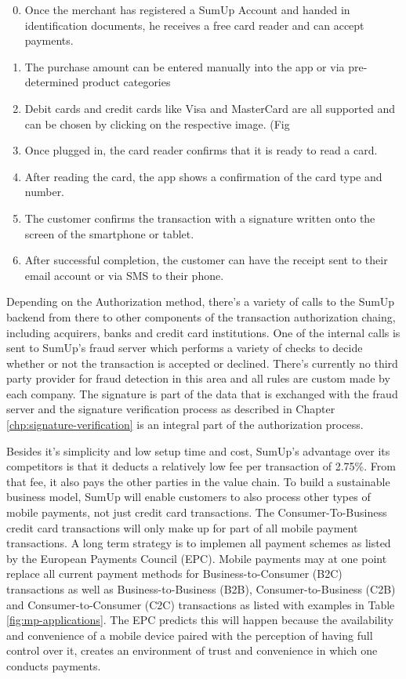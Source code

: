 \documentclass[a4paper, oneside]{csthesis}
\begin{document}
\begin{enumerate}
\setcounter{enumi}{-1}
    \item Once the merchant has registered a SumUp Account and handed in identification documents, he receives a free card reader and can accept payments.
    \item The purchase amount can be entered manually into the app or via pre-determined product categories %
    \item Debit cards and credit cards like Visa and MasterCard are all supported and can be chosen by clicking on the respective image. (Fig %
    \item Once plugged in, the card reader confirms that it is ready to read a card. %
    \item After reading the card, the app shows a confirmation of the card type and number. %
    \item The customer confirms the transaction with a signature written onto the screen of the smartphone or tablet. %
    \item After successful completion, the customer can have the receipt sent to their email account or via SMS to their phone. %
\end{enumerate}


Depending on the Authorization method, there's a variety of calls to the SumUp backend from there to other components of the transaction authorization chaing, including acquirers, banks and credit card institutions. One of the internal calls is sent to SumUp's fraud server which performs a variety of checks to decide whether or not the transaction is accepted or declined. There's currently no third party provider for fraud detection in this area and all rules are custom made by each company. The signature is part of the data that is exchanged with the fraud server and the signature verification process as described in Chapter \ref{chp:signature-verification} is an integral part of the  authorization process.

Besides it's simplicity and low setup time and cost, SumUp's advantage over its competitors is that it deducts a relatively low fee per transaction of 2.75\%. From that fee, it also pays the other parties in the value chain. To build a sustainable business model, SumUp will enable customers to also process other types of mobile payments, not just credit card transactions. The Consumer-To-Business credit card transactions will only make up for part of all mobile payment transactions. A long term strategy is to implemen all payment schemes as listed by the European Payments Council (EPC). Mobile payments may at one point replace all current payment methods for Business-to-Consumer (B2C) transactions as well as Business-to-Business (B2B), Consumer-to-Business (C2B) and Consumer-to-Consumer (C2C) transactions as listed with examples in Table \ref{fig:mp-applications}. The EPC predicts this will happen because the availability and convenience of a mobile device paired with the perception of having full control over it, creates an environment of trust and convenience in which one conducts payments. \cite{mpwhitepaper}
\end{document}
